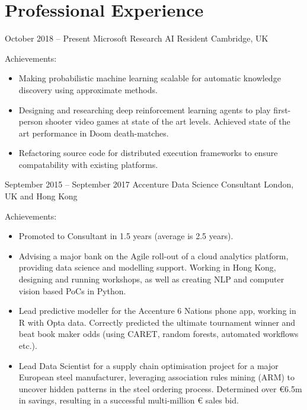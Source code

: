 \documentclass[]{friggeri-cv} %
\begin{document}

\section{Professional Experience}


\begin{entrylist}


\entry
{October 2018 -- Present}
{Microsoft Research}
{AI Resident}
{Cambridge, UK}
{Achievements:
\begin{itemize}
    \item Making probabilistic machine learning scalable for automatic knowledge discovery using approximate methods.
    \item Designing and researching deep reinforcement learning agents to play first-person shooter video games at state of the art levels. Achieved state of the art performance in Doom death-matches.
    \item Refactoring source code for distributed execution frameworks to ensure compatability with existing platforms.
\end{itemize}
}

\entry
{September 2015 -- September 2017}
{Accenture}
{Data Science Consultant}
{London, UK and Hong Kong}
{Achievements:
\begin{itemize}
    \item Promoted to Consultant in 1.5 years (average is 2.5 years).
    \item Advising a major bank on the Agile roll-out of a cloud analytics platform, providing data
    science and modelling support. Working in Hong Kong, designing and running workshops,
    as well as creating NLP and computer vision based PoCs in Python.
    \item Lead predictive modeller for the Accenture 6 Nations phone app, working in R with Opta
    data. Correctly predicted the ultimate tournament winner and beat book maker odds
    (using CARET, random forests, automated workflows etc.).
    \item Lead Data Scientist for a supply chain optimisation project for a major European steel
    manufacturer, leveraging association rules mining (ARM) to uncover hidden patterns in
    the steel ordering process. Determined over €6.5m in savings, resulting in a successful
    multi-million € sales bid.
    

\end{itemize}}
\end{entrylist}
\end{document}
